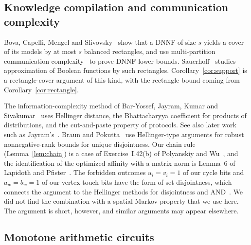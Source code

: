 \subsection{Knowledge compilation and communication complexity}

Bova, Capelli, Mengel and Slivovsky~\cite[Thm.~6]{BovaCapelliMengelSlivovsky16} show that a DNNF of size $s$ yields a cover of its models by at most $s$ balanced rectangles, and use multi-partition communication complexity~\cite{DurisEtAl04} to prove DNNF lower bounds. Sauerhoff~\cite{Sauerhoff03} studies approximation of Boolean functions by such rectangles. Corollary~\ref{cor:support} is a rectangle-cover argument of this kind, with the rectangle bound coming from Corollary~\ref{cor:rectangle}.

The information-complexity method of Bar-Yossef, Jayram, Kumar and Sivakumar~\cite{BJKS04} uses Hellinger distance, the Bhattacharyya coefficient for products of distributions, and the cut-and-paste property of protocols. See also later work such as Jayram's~\cite{Jayram09}. Braun and Pokutta~\cite{BraunPokutta16} use Hellinger-type arguments for robust nonnegative-rank bounds for unique disjointness. Our chain rule (Lemma~\ref{lem:chain}) is a case of Exercise~I.42(b) of Polyanskiy and Wu~\cite{PolyanskiyWu25}, and the identification of the optimized affinity with a matrix norm is Lemma~6 of Lapidoth and Pfister~\cite{LapidothPfister19}. The forbidden outcomes $u_i=v_i=1$ of our cycle bits and $a_w=b_w=1$ of our vertex-touch bits have the form of set disjointness, which connects the argument to the Hellinger methods for disjointness and AND~\cite{BJKS04,Jayram09}. We did not find the combination with a spatial Markov property that we use here. The argument is short, however, and similar arguments may appear elsewhere.

\subsection{Monotone arithmetic circuits}

